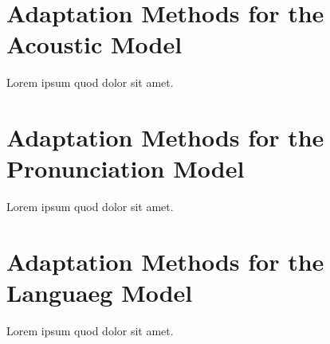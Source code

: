 \section{Adaptation Methods for the Acoustic Model}
Lorem ipsum quod dolor sit amet.

\section{Adaptation Methods for the Pronunciation Model}
Lorem ipsum quod dolor sit amet.

\section{Adaptation Methods for the Languaeg Model}
Lorem ipsum quod dolor sit amet.


